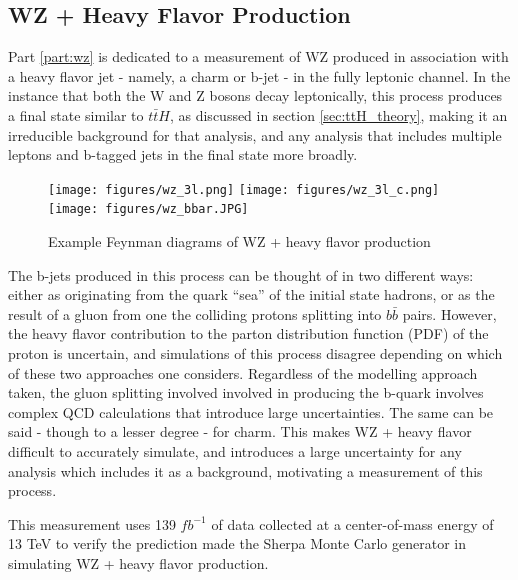 
\subsection{WZ + Heavy Flavor Production}
\label{sec:WZ_theory}

Part \ref{part:wz} is dedicated to a measurement of WZ produced in association with a heavy flavor jet - namely, a charm or b-jet - in the fully leptonic channel. In the instance that both the W and Z bosons decay leptonically, this process produces a final state similar to $t\bar{t}H$, as discussed in section \ref{sec:ttH_theory}, making it an irreducible background for that analysis, and any analysis that includes multiple leptons and b-tagged jets in the final state more broadly.

\begin{figure}[H]
  \centering
  \texttt{[image: figures/wz\_3l.png]}%
  \texttt{[image: figures/wz\_3l\_c.png]}%
  \texttt{[image: figures/wz\_bbar.JPG]}
  \caption{Example Feynman diagrams of WZ + heavy flavor production}
  \label{fig:wz_feynman}
\end{figure}

The b-jets produced in this process can be thought of in two different ways: either as originating from the quark ``sea'' of the initial state hadrons, or as the result of a gluon from one the colliding protons splitting into $b\bar{b}$ pairs. However, the heavy flavor contribution to the parton distribution function (PDF) of the proton is uncertain, and simulations of this process disagree depending on which of these two approaches one considers. Regardless of the modelling approach taken, the gluon splitting involved involved in producing the b-quark involves complex QCD calculations that introduce large uncertainties. The same can be said - though to a lesser degree - for charm. This makes WZ + heavy flavor difficult to accurately simulate, and introduces a large uncertainty for any analysis which includes it as a background, motivating a measurement of this process.

This measurement uses 139 $fb^{-1}$ of data collected at a center-of-mass energy of 13 TeV to verify the prediction made the Sherpa Monte Carlo generator \cite{sherpa} in simulating WZ + heavy flavor production.



